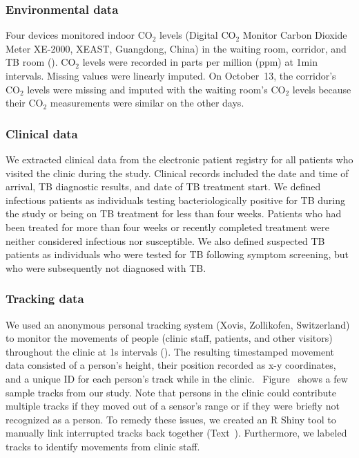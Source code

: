 \documentclass[fleqn,11pt]{wlscirep}
\begin{document}
\subsubsection{Environmental data}

Four devices monitored indoor CO$_2$ levels (Digital CO$_2$ Monitor Carbon Dioxide Meter XE-2000, XEAST, Guangdong, China) in the waiting room, corridor, and TB room (). CO$_2$ levels were recorded in parts per million (ppm) at 1min intervals. Missing values were linearly imputed. On October~13, the corridor's CO$_2$ levels were missing and imputed with the waiting room's CO$_2$ levels because their CO$_2$ measurements were similar on the other days.    

\subsubsection{Clinical data}

We extracted clinical data from the electronic patient registry for all patients who visited the clinic during the study. Clinical records included the date and time of arrival, TB diagnostic results, and date of TB treatment start. We defined infectious patients as individuals testing bacteriologically positive for TB during the study or being on TB treatment for less than four weeks. Patients who had been treated for more than four weeks or recently completed treatment were neither considered infectious nor susceptible. We also defined suspected TB patients as individuals who were tested for TB following symptom screening, but who were subsequently not diagnosed with TB. 

\subsubsection{Tracking data}

We used an anonymous personal tracking system (Xovis, Zollikofen, Switzerland) to monitor the movements of people (clinic staff, patients, and other visitors) throughout the clinic at 1s intervals (). The resulting timestamped movement data consisted of a person’s height, their position recorded as x-y coordinates, and a unique ID for each person's track while in the clinic. \supp~Figure~ shows a few sample tracks from our study. Note that persons in the clinic could contribute multiple tracks if they moved out of a sensor's range or if they were briefly not recognized as a person. To remedy these issues, we created an R Shiny tool to manually link interrupted tracks back together (\supp Text~). Furthermore, we labeled tracks to identify movements from clinic staff.  
\end{document}
